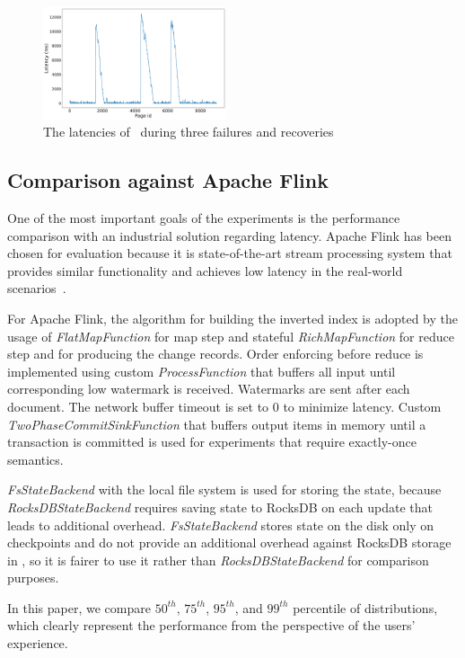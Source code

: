 \begin{figure}[htbp]
  \centering
  \includegraphics[width=0.48\textwidth]{pics/blink}
  \caption{The latencies of \FlameStream\ during three failures and recoveries}
  \label {recovery}
\end{figure}

\subsection{Comparison against Apache Flink}
One of the most important goals of the experiments is the performance comparison with an industrial solution regarding latency. Apache Flink has been chosen for evaluation because it is state-of-the-art stream processing system that provides similar functionality and achieves low latency in the real-world scenarios~\cite{S7530084}. 

For Apache Flink, the algorithm for building the inverted index is adopted by the usage of {\it FlatMapFunction} for map step and stateful {\it RichMapFunction} for reduce step and for producing the change records. Order enforcing before reduce is implemented using custom {\it ProcessFunction} that buffers all input until corresponding low watermark is received. Watermarks are sent after each document. The network buffer timeout is set to 0 to minimize latency. Custom {\it TwoPhaseCommitSinkFunction} that buffers output items in memory until a transaction is committed is used for experiments that require exactly-once semantics. 

{\it FsStateBackend} with the local file system is used for storing the state, because {\it RocksDBStateBackend} requires saving state to RocksDB on each update that leads to additional overhead. {\it FsStateBackend} stores state on the disk only on checkpoints and do not provide an additional overhead against RocksDB storage in \FlameStream, so it is fairer to use it rather than {\it RocksDBStateBackend} for comparison purposes.

In this paper, we compare $50^{th}$, $75^{th}$, $95^{th}$, and $99^{th}$ percentile of distributions, which clearly represent the performance from the perspective of the users' experience.

